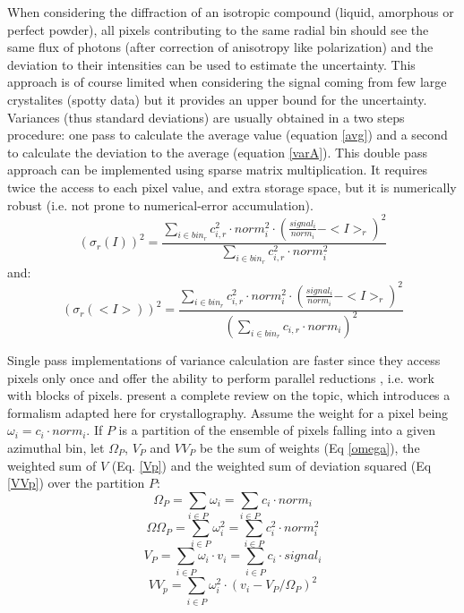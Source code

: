 \documentclass[preprint]{iucr}              %
\begin{document}
When considering the diffraction of an isotropic compound (liquid, amorphous or perfect powder), all pixels contributing to the same radial bin should see the same flux of photons (after correction of anisotropy like polarization) and the deviation to their intensities can be used to estimate the uncertainty. 
This approach is of course limited when considering the signal coming from few large crystalites (spotty data) but it provides an upper bound for the uncertainty.
Variances (thus standard deviations) are usually obtained in a two steps procedure: one pass to calculate the average value (equation \ref{avg}) and a second to calculate the deviation to the average (equation \ref{varA}). 
This double pass approach can be implemented using sparse matrix multiplication. 
It requires twice the access to each pixel value, and extra storage space, but it is numerically robust (i.e. not prone to numerical-error accumulation).
\begin{equation}
\label{varA}
    (\sigma_{r}(I))^2 = \frac {\sum\limits_{i \in bin_r} c_{i,r}^2 \cdot norm_i^2 \cdot (\frac{signal_i}{norm_i}-<I>_r)^2}
                              {\sum\limits_{i \in bin_r} c_{i,r}^2 \cdot norm_i^2}
\end{equation}
and:
\begin{equation}
\label{varB}
(\sigma_{r}(<I>))^2 = \frac{\sum\limits_{i \in bin_r} c_{i,r}^2 \cdot norm_i^2 \cdot (\frac{signal_i}{norm_i}-<I>_r)^2}
                         {(\sum\limits_{i \in bin_r} c_{i,r} \cdot norm_i)^2}  
\end{equation}


Single pass implementations of variance calculation are faster since they access pixels only once and offer the ability to perform parallel reductions \cite{Blelloch}, i.e. work with blocks of pixels.
 present a complete review on the topic, which introduces a formalism adapted here for crystallography.
Assume the weight for a pixel being $\omega_i = c_i \cdot norm_i$.
If $P$ is a partition of the ensemble of pixels falling into a given azimuthal bin, let $\Omega_{P}$, $V_{P}$ and $VV_{P}$  
be the sum of weights (Eq \ref{omega}), the weighted sum of $V$ (Eq. \ref{Vp}) and the weighted sum of deviation squared (Eq \ref{VVp}) over the partition $P$: 
\begin{equation}
\label{omega}
\Omega_{P} = \sum\limits_{i \in P} \omega_i = \sum\limits_{i \in P} c_i \cdot norm_i 
\end{equation}
\begin{equation}
\label{omegaomega}
\Omega\Omega_{P} = \sum\limits_{i \in P} \omega_i^2 = \sum\limits_{i \in P} c_i^2 \cdot norm_i^2 
\end{equation}
\begin{equation}
\label{Vp}
V_{P} = \sum\limits_{i \in P} \omega_i \cdot v_i =  \sum\limits_{i \in P} c_i \cdot signal_i
\end{equation}
\begin{equation}
\label{VVp}
VV_{p} = \sum\limits_{i \in P} \omega_i^2 \cdot (v_i - V_{P}/\Omega_{P})^2 
\end{equation}
\end{document}
